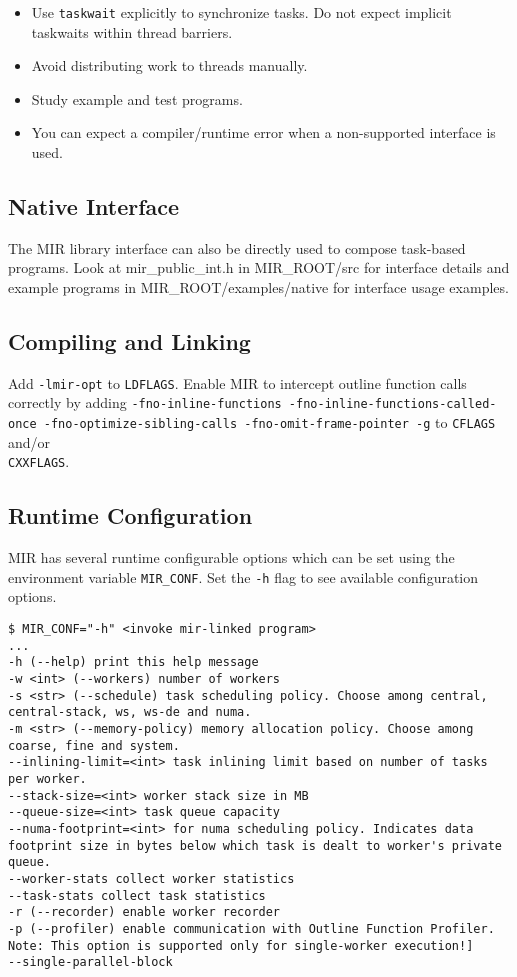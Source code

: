 \documentclass[11pt,a4paper]{article}
\begin{document}
\begin{itemize}
    \item Use \texttt{taskwait} explicitly to synchronize tasks. Do not expect implicit taskwaits within thread barriers.
        \item Avoid distributing work to threads manually.
        \item Study example and test programs.
        \item You can expect a compiler/runtime error when a non-supported interface is used.
\end{itemize}

\subsection{Native Interface}\label{native-interface}

The MIR library interface can also be directly used to compose task-based programs. Look at mir\_public\_int.h in MIR\_ROOT/src for interface details and example programs in MIR\_ROOT/examples/native for interface usage examples.

\subsection{Compiling and Linking}\label{compiling-and-linking}

Add \texttt{-lmir-opt} to \texttt{LDFLAGS}. Enable MIR to intercept outline function calls\\correctly by adding \texttt{{\footnotesize -fno-inline-functions -fno-inline-functions-called-once -fno-optimize-sibling-calls -fno-omit-frame-pointer -g}}  to \texttt{CFLAGS} and/or \\\texttt{CXXFLAGS}.

\subsection{Runtime Configuration}\label{runtime-configuration}

MIR has several runtime configurable options which can be set using the environment variable \texttt{MIR\_CONF}. Set the \texttt{-h} flag to see available configuration options.

\begin{lstlisting}[style=MyInputStyle]
$ MIR_CONF="-h" <invoke mir-linked program>
...
-h (--help) print this help message
-w <int> (--workers) number of workers
-s <str> (--schedule) task scheduling policy. Choose among central, central-stack, ws, ws-de and numa.
-m <str> (--memory-policy) memory allocation policy. Choose among coarse, fine and system.
--inlining-limit=<int> task inlining limit based on number of tasks per worker.
--stack-size=<int> worker stack size in MB
--queue-size=<int> task queue capacity
--numa-footprint=<int> for numa scheduling policy. Indicates data footprint size in bytes below which task is dealt to worker's private queue.
--worker-stats collect worker statistics
--task-stats collect task statistics
-r (--recorder) enable worker recorder
-p (--profiler) enable communication with Outline Function Profiler. Note: This option is supported only for single-worker execution!]
--single-parallel-block
\end{lstlisting}
\end{document}

